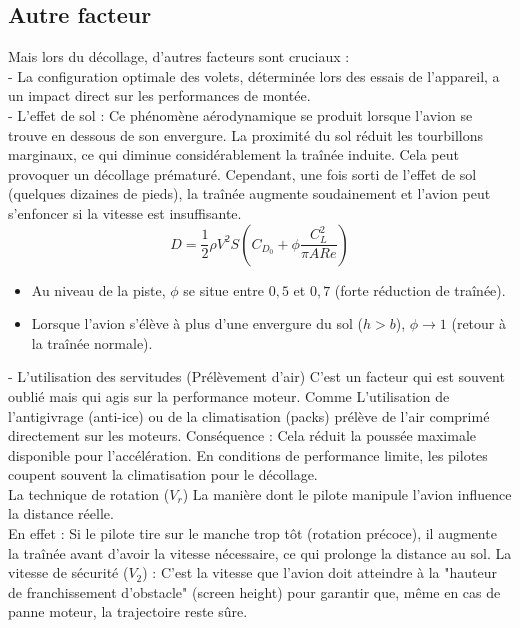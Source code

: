 			
			\subsection{Autre facteur }
			Mais lors du décollage, d'autres facteurs sont cruciaux :\\
			
			- La configuration optimale des volets, déterminée lors des essais de l'appareil, a un impact direct sur les performances de montée.\\
			
			- L'effet de sol : Ce phénomène aérodynamique se produit lorsque l'avion se trouve en dessous de son envergure. La proximité du sol réduit les tourbillons marginaux, ce qui diminue considérablement la traînée induite. Cela peut provoquer un décollage prématuré. Cependant, une fois sorti de l'effet de sol (quelques dizaines de pieds), la traînée augmente soudainement et l'avion peut s'enfoncer si la vitesse est insuffisante.\\
			
			\begin{equation}
				D = \frac{1}{2}\rho V^2 S \left( C_{D_0} + \phi \frac{C_L^2}{\pi AR e} \right)
			\end{equation}
			
			\begin{itemize}
				\item Au niveau de la piste, $\phi$ se situe entre $0{,}5$ et $0{,}7$ (forte réduction de traînée).
				\item Lorsque l'avion s'élève à plus d'une envergure du sol ($h > b$), $\phi \to 1$ (retour à la traînée normale).
			\end{itemize}
			
			
			- L'utilisation des servitudes (Prélèvement d'air)
			C'est un facteur  qui est souvent oublié mais qui agis sur la performance moteur.
			Comme L'utilisation de l'antigivrage (anti-ice) ou de la climatisation (packs) prélève de l'air comprimé directement sur les moteurs.
			Conséquence : Cela réduit la poussée maximale disponible pour l'accélération. En conditions de performance limite, les pilotes coupent souvent la climatisation pour le décollage.\\
			
			
			La technique de rotation ($V_r$)
			La manière dont le pilote manipule l'avion influence la distance réelle.\\
			En effet : Si le pilote tire sur le manche trop tôt (rotation précoce), il augmente la traînée avant d'avoir la vitesse nécessaire, ce qui prolonge la distance au sol.
			La vitesse de sécurité ($V_2$) : C'est la vitesse que l'avion doit atteindre à la "hauteur de franchissement d'obstacle" (screen height) pour garantir que, même en cas de panne moteur, la trajectoire reste sûre.
			
